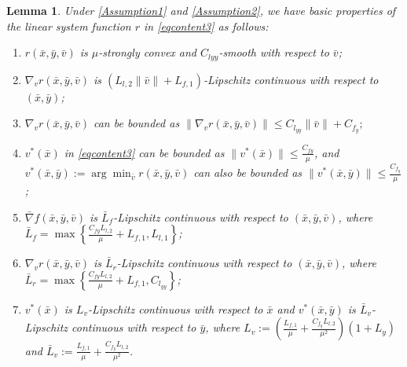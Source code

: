 \documentclass{article}
\theoremstyle{plain}
\newtheorem{lemma}[lemma]{Lemma}
\theoremstyle{definition}
\theoremstyle{remark}
\begin{document}
\begin{lemma}\label{Lemma3} Under \cref{Assumption1} and \cref{Assumption2}, we have basic properties of the linear system function \(r\) in \cref{eqcontent3} as follows:

\begin{enumerate}
    \item[1).] \(r(\bar{x}, \bar{y}, \bar{v})\) is \(\mu\)-strongly convex and \(C_{l{yy}}\)-smooth with respect to \(\bar{v}\);
    \item[2).] \(\nabla_{{v}} r(\bar{x}, \bar{y}, \bar{v})\) is \((L_{l,2} \|\bar{v}\| + L_{f,1})\)-Lipschitz continuous with respect to \((\bar{x}, \bar{y})\);
    \item[3).] \(\nabla_{{v}} r(\bar{x}, \bar{y}, \bar{v})\) can be bounded as $\|\nabla_{{v}} r(\bar{x}, \bar{y}, \bar{v})\| \leq C_{l_{yy}} \|\bar{v}\| + C_{f_y};$
    \item[4).] \({v}^*(\bar{x})\) in \cref{eqcontent3} can be bounded as $\|{v}^*(\bar{x})\| \leq \frac{C_{fy}}{\mu}$, and \({v}^*(\bar{x}, \bar{y}) := \arg\min_{\bar{v}} r(\bar{x}, \bar{y}, \bar{v})\) can also be bounded as $\|{v}^*(\bar{x}, \bar{y})\| \leq \frac{C_{f_y}}{\mu}$;
    \item[5).] \(\bar{\nabla} f(\bar{x}, \bar{y}, \bar{v})\) is $\bar{L}_f$-Lipschitz continuous with respect to $(\bar{x}, \bar{y}, \bar{v})$, where $\bar{L}_f=\max\left\{\frac{C_{fy}L_{l,2}}{\mu} + L_{f,1}, L_{l,1}\right\}$;
    \item[6).] \(\nabla_{{v}} r(\bar{x}, \bar{y}, \bar{v})\) is $\bar{L}_r$-Lipschitz continuous with respect to $(\bar{x}, \bar{y}, \bar{v})$, where $\bar{L}_r=\max\left\{\frac{C_{fy}L_{l,2}}{\mu} + L_{f,1}, C_{l_{yy}}\right\}$;
    \item[7).] \({v}^*(\bar{x})\) is \(L_v\)-Lipschitz continuous with respect to \(\bar{x}\) and \({v}^*(\bar{x}, \bar{y})\) is \(\bar{L}_v\)-Lipschitz continuous with respect to \(\bar{y}\), where $L_v := \left(\frac{L_{f,1}}{\mu} + \frac{C_{f_y} L_{l,2}}{\mu^2} \right)(1 + L_y)$ and $\bar{L}_v := \frac{L_{f,1}}{\mu} + \frac{C_{f_y} L_{l,2}}{\mu^2}$.
\end{enumerate}
\end{lemma}
\end{document}
